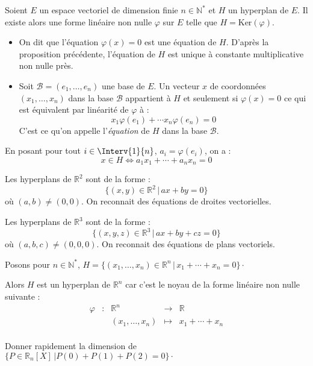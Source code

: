 \documentclass[a4paper,10pt]{report}
\begin{document}
\newpage

$\phantom{test}$

\vspace{9cm}

\begin{defip} Soient $E$ un espace vectoriel de dimension finie $n \in \mathbb{N}^*$ et $H$ un hyperplan de $E$. Il existe alors une forme linéaire non nulle $\varphi$ sur $E$ telle que $H = \textrm{Ker}(\varphi)$. 

\begin{itemize}
\item On dit que l'équation $\varphi(x)=0$ est une équation de $H$. D'après la proposition précédente, l'équation de $H$ est unique à constante multiplicative non nulle près.
\item Soit $\mathcal{B}=(e_1, \ldots, e_n)$ une base de $E$. Un vecteur $x$ de coordonnées $(x_1, \ldots, x_n)$ dans la base $\mathcal{B}$ appartient à $H$ et seulement si $\varphi(x)=0$ ce qui est équivalent par linéarité de $\varphi$ à :
$$x_1 \varphi(e_1) + \cdots x_n \varphi(e_n) = 0$$
C'est ce qu'on appelle l'\textit{équation} de $H$ dans la base $\mathcal{B}$.
\end{itemize}
\end{defip}

\begin{rem} En posant pour tout $i \in \Interv{1}{n}$, $a_i = \varphi(e_i)$, on a :
$$ x \in H \Longleftrightarrow a_1 x_1 + \cdots + a_n x_n = 0$$
\end{rem}

\begin{exems}
\item Les hyperplans de $\mathbb{R}^2$ sont de la forme :
$$ \lbrace  (x,y) \in \mathbb{R}^2 \, \vert \,  ax+by = 0 \rbrace$$
où $(a,b) \neq (0,0)$. On reconnait des équations de droites vectorielles.
\item  Les hyperplans de $\mathbb{R}^3$ sont de la forme :
$$ \lbrace   (x,y,z) \in \mathbb{R}^3 \, \vert \, ax+by+cz = 0\rbrace$$
où $(a,b,c) \neq (0,0,0)$. On reconnait des équations de plans vectoriels.
\item Posons pour $n \in \mathbb{N}^*$, $H = \lbrace (x_1, \ldots, x_n) \in \mathbb{R}^n \, \vert \, x_1 + \cdots + x_n = 0 \rbrace \cdot$

\noindent Alors $H$ est un hyperplan de $\mathbb{R}^n$ car c'est le noyau de la forme linéaire non nulle suivante :
$$ \begin{array}{ccccl}
\varphi & : & \mathbb{R}^n  & \rightarrow & \mathbb{R} \\
& & (x_1, \ldots, x_n) & \mapsto &  x_1 + \cdots + x_n \\
\end{array}$$
\end{exems}

\begin{exa} Donner rapidement la dimension de $\lbrace P \in \mathbb{R}_n[X] \, \vert P(0)+P(1)+P(2)= 0 \rbrace\cdot$ \end{exa}
\end{document}
